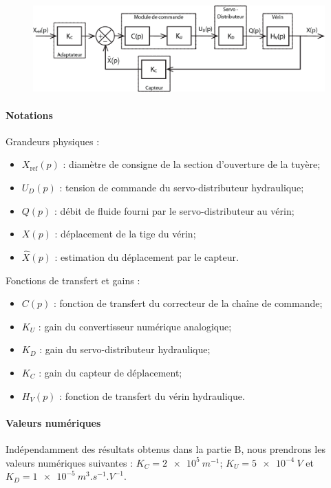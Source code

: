 \documentclass[10pt,fleqn]{article} %
\begin{document}
	\begin{figure}[H]
\centering
\includegraphics[width=\linewidth]{img_10}
\end{figure}

\paragraph*{Notations}

Grandeurs physiques :
\begin{itemize}
\item $X_{\text{ref}}(p)$	: diamètre de consigne de la section d'ouverture de la tuyère;
\item $U_D(p)$		: tension de commande du servo-distributeur hydraulique;
\item $Q(p)$	  	: débit de fluide fourni par le servo-distributeur au vérin;
\item $X(p)$ 		: déplacement de la tige du vérin;
\item $\hat{X}(p)$ 	: estimation du déplacement par le capteur.
\end{itemize}

Fonctions de transfert et gains :
\begin{itemize}
\item $C(p)$	: fonction de transfert du correcteur de la chaîne de commande;
\item $K_U$	: gain du convertisseur numérique analogique;
\item $K_D$	: gain du servo-distributeur hydraulique;
\item $K_C$	: gain du capteur de déplacement;
\item $H_V(p)$	: fonction de transfert du vérin hydraulique.
\end{itemize}

\paragraph*{Valeurs numériques}
Indépendamment des résultats obtenus dans la partie B, nous prendrons les valeurs numériques suivantes :  
$K_C = \SI{2e5}{m^{-1}}$; 
$K_U = \SI{5e-4}{V}$ et 
$K_D = \SI{1e-5}{m^3.s^{-1}.V^{-1}}$.
\end{document}
